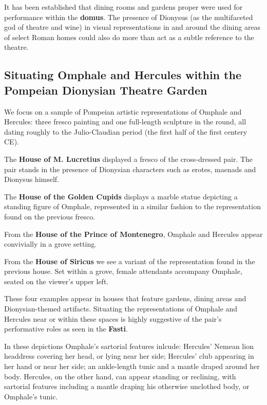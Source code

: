 It has been established that dining rooms and gardens proper were used for performance within the \textbf{domus}. The presence of Dionysus (as the multifaceted god of theatre and wine) in visual representations in and around the dining areas of select Roman homes could also do more than act as a subtle reference to the theatre.


\subsection{Situating Omphale and Hercules within the Pompeian Dionysian Theatre Garden}

We focus on a sample of Pompeian artistic representations of Omphale and Hercules: three fresco painting and one full-length sculpture in the round, all dating roughly to the Julio-Claudian period (the first half of the first centery CE).

\begin{rmk}
    The \textbf{House of M. Lucretius} displayed a fresco of the cross-dressed pair. The pair stands in the presence of Dionysian characters such as erotes, maenads and Dionysus himself.
\end{rmk}


\begin{rmk}
    The \textbf{House of the Golden Cupids} displays a marble statue depicting a standing figure of Omphale, represented in a similar fashion to the representation found on the previous fresco.
\end{rmk}


\begin{rmk}
    From the \textbf{House of the Prince of Montenegro}, Omphale and Hercules appear convivially in a grove setting.
\end{rmk}

\begin{rmk}
    From the \textbf{House of Siricus} we see a variant of the representation found in the previous house. Set within a grove, female attendants accompany Omphale, seated on the viewer's upper left.
\end{rmk}

These four examples appear in houses that feature gardens, dining areas and Dionysian-themed artifacts. Situating the representations of Omphale and Hercules near or within these spaces is highly suggestive of the pair's performative roles as seen in the \textbf{Fasti}.

\begin{nte}
    In these depictions Omphale's sartorial features inlcude: Hercules' Nemean lion headdress covering her head, or lying near her side; Hercules' club appearing in her hand or near her side; an ankle-length tunic and a mantle draped around her body. Hercules, on the other hand, can appear standing or reclining, with sartorial features including a mantle draping his otherwise unclothed body, or Omphale's tunic.
\end{nte}

